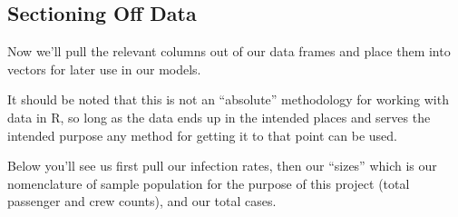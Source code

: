 \documentclass[
  11,
]{book}
\begin{document}
\hypertarget{sectioning-off-data}{%
\subsection*{Sectioning Off Data}\label{sectioning-off-data}}


Now we'll pull the relevant columns out of our data frames and place them into vectors for later use in our models.

It should be noted that this is not an ``absolute'' methodology for working with data in R, so long as the data ends up in the intended places and serves the intended purpose any method for getting it to that point can be used.

Below you'll see us first pull our infection rates, then our ``sizes'' which is our nomenclature of sample population for the purpose of this project (total passenger and crew counts), and our total cases.
\end{document}
